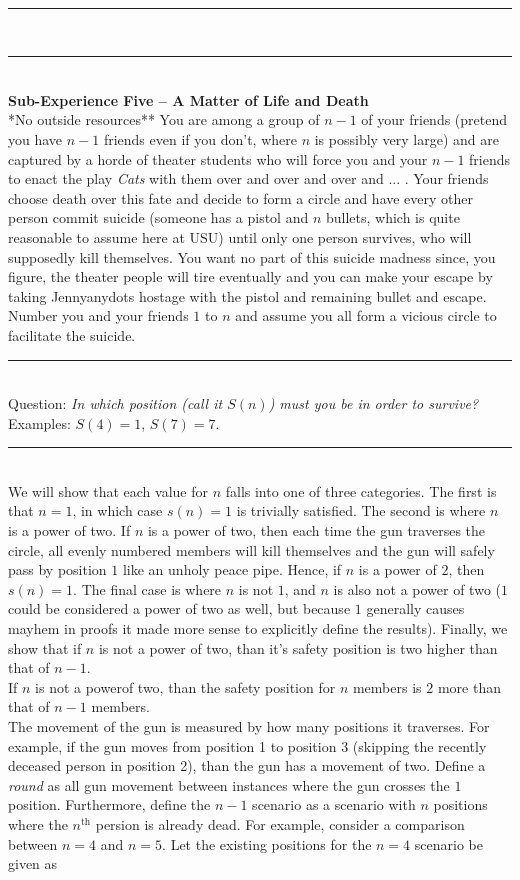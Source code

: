 \documentclass{article}
\newcommand{\problemsep}{\leavevmode\\[0.05in] \rule[\baselineskip/4]{\textwidth}{1pt} \\[0.005in] \rule[\baselineskip]{\textwidth}{1pt}\vspace{-\baselineskip/2}\leavevmode\\[0.05in]}
\newcommand{\statementsep}{\leavevmode\\[0.005in] \rule[\baselineskip/4]{\textwidth}{0.4pt}\leavevmode\\[0.005in]}
\begin{document}
\problemsep
\noindent \maltese \hspace{1em} {\bf Sub-Experience Five -- A Matter of Life and 
Death}\\
\noindent **No outside resources**  You are among a group of $n-1$  of your friends
(pretend you have $n-1$ friends even if you don't, where $n$ is possibly very 
large)
and are captured by a horde of theater students who will force you and your $n-1$ 
friends to
enact the play \emph{Cats} with them over and over and over and ... .
Your friends choose death over this fate and decide to
form a circle and have every other person commit suicide (someone has a pistol and 
$n$ bullets,
which is quite reasonable to assume here at USU) until only one person survives, 
who will
supposedly kill themselves.
You want no part of this suicide madness since, you figure, the theater people will
tire eventually and
you can make your escape by taking Jennyanydots hostage with the pistol and 
remaining bullet and escape.\\
\noindent Number you and your friends $1$ to $n$ and assume you all form a vicious 
circle to facilitate the suicide.
\statementsep
\noindent \textsf{Question:} \emph{In which position (call it $S(n)$) must you be 
in order to survive?}\\
\noindent Examples: $S(4) =1$, $S(7) =7$.
\statementsep
We will show that each value for $n$ falls into one of three categories. The first is that $n = 1$, in which case $s(n) = 1$ is trivially satisfied. The second is where $n$ is a power of two. If $n$ is a power of two, then each time the gun traverses the circle, all evenly numbered members will kill themselves and the gun will safely pass by position $1$ like an unholy peace pipe. Hence, if $n$ is a power of $2$, then $s(n) = 1$. The final case is where $n$ is not $1$, and $n$ is also not a power of two ($1$ could be considered a power of two as well, but because $1$ generally causes mayhem in proofs it made more sense to explicitly define the results). Finally, we show that if $n$ is not a power of two, than it's safety position is two higher than that of $n - 1$.
\\  If $n$ is not a powerof two, than the safety position for $n$ members is $2$ more than that of $n - 1$ members.
\\  The movement of the gun is measured by how many positions it traverses. For example, if the gun moves from position 1 to position 3 (skipping the recently deceased person in position 2), than the gun has a movement of two. Define a {\it round} as all gun movement between instances where the gun crosses the $1$ position. Furthermore, define the $n - 1$ scenario as a scenario with $n$ positions where the $n^{\text{th}}$ persion is already dead. For example, consider a comparison between $n = 4$ and $n = 5$. Let the existing positions for the $n = 4$ scenario be given as 
\end{document}
